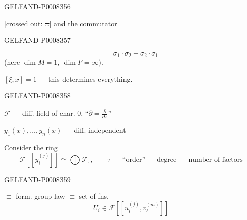 \begin{GelfandAdjacentEvidence}{GELFAND-P000835}{6}


[crossed out: \sout{…}] and the commutator
\end{GelfandAdjacentEvidence}
\begin{GelfandAdjacentEvidence}{GELFAND-P000835}{7}

\begin{equation*}
[\sigma_1,\sigma_2]=\sigma_1\cdot\sigma_2-\sigma_2\cdot\sigma_1
\tag{5}
\end{equation*}
(here \(\dim M=1\), \(\dim F=\infty\)).

\([\xi,x]=1\) — this determines everything.

\end{GelfandAdjacentEvidence}
\begin{GelfandAdjacentEvidence}{GELFAND-P000835}{8}


\(\mathcal F\) — diff. field of char. \(0\), \qquad “\(\partial=\frac{\partial}{\partial x}\)”

\(y_1(x),\ldots,y_n(x)\) — diff. independent

Consider the ring
\begin{equation*}
\mathcal F[[y_i^{(j)}]]\simeq\bigoplus\mathcal F_\tau,
\qquad \tau\text{ — “order” — degree — number of factors}
\tag{6}
\end{equation*}
\end{GelfandAdjacentEvidence}
\begin{GelfandAdjacentEvidence}{GELFAND-P000835}{9}


 \(\equiv\) form. group law \(\equiv\) set of fns.
\begin{equation*}
U_i\in\mathcal F[[u_i^{(j)},v_\ell^{(m)}]]
\tag{7}
\end{equation*}
\end{GelfandAdjacentEvidence}


